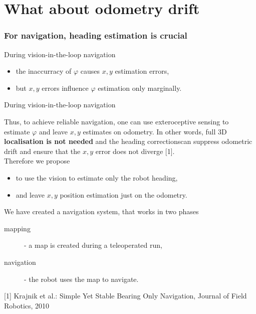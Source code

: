 \section{What about odometry drift}
\begin{frame}
   \frametitle{For navigation, heading estimation is crucial}

   During vision-in-the-loop navigation
   \begin{itemize}
	\item the inaccurracy of $\varphi$ causes $x,y$ estimation errors, 
	\item but $x,y$ errors influence $\varphi$ estimation only marginally.
   \end{itemize}
   \vspace{5mm}
   During vision-in-the-loop navigation


   Thus, to achieve reliable navigation, one can use exteroceptive sensing to estimate $\varphi$ and leave $x,y$ estimates on odometry. 
   In other words, full 3D \textbf{localisation is not needed} and the heading correctionscan suppress odometric drift and ensure that the $x,y$ error does not diverge [1].\\ 
   Therefore we propose
   \begin{itemize}
 	\item to use the vision to estimate only the robot heading,
 	\item and leave $x,y$ position estimation just on the odometry.
   \end{itemize}
   \vspace{5mm}
   We have created a navigation system, that works in two phases
   \begin{description}
	\item[mapping] - a  map is created during a teleoperated run,
 	\item[navigation]  - the robot uses the map to navigate.
   \end{description}
   \tiny{[1] Krajnik et al.: Simple Yet Stable Bearing Only Navigation, Journal of Field Robotics, 2010}
\end{frame}


